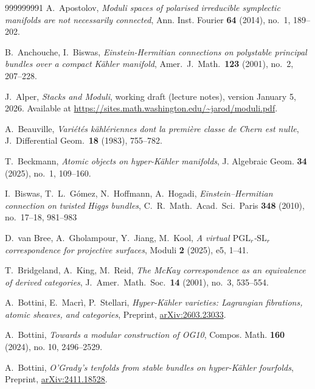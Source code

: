 \documentclass[12pt,a4paper]{amsart}
\theoremstyle{plain}
\theoremstyle{definition}
\theoremstyle{remark}
\begin{document}
\begin{thebibliography}{999999991}
\setlength{\itemsep}{6pt}
A.~Apostolov,
\textit{Moduli spaces of polarised irreducible symplectic manifolds are not necessarily connected},
Ann. Inst. Fourier \textbf{64} (2014), no.~1, 189--202.

B.~Anchouche, I.~Biswas,
\textit{Einstein-Hermitian connections on polystable principal bundles over a compact K\"ahler manifold},
Amer.\ J.\ Math.\ \textbf{123} (2001), no.~2, 207--228.

J.~Alper,
\textit{Stacks and Moduli},
working draft (lecture notes), version January 5, 2026.
Available at \url{https://sites.math.washington.edu/~jarod/moduli.pdf}.

A.~Beauville,
\textit{Vari\'et\'es k\"ahl\'eriennes dont la premi\`ere classe de Chern est nulle},
J.\ Differential Geom.\ \textbf{18} (1983), 755--782.

T.~Beckmann, \textit{Atomic objects on hyper-K\"ahler manifolds}, J. Algebraic Geom. {\bf 34} (2025), no.~1, 109--160.

I.~Biswas, T.~L.~G\'omez, N.~Hoffmann, A.~Hogadi,
\textit{Einstein--Hermitian connection on twisted Higgs bundles},
C.\ R.\ Math.\ Acad.\ Sci.\ Paris \textbf{348} (2010), no.~17--18, 981--983

D.~van Bree, A.~Gholampour, Y.~Jiang, M.~Kool,
\textit{A virtual $\mathrm{PGL}_r$-$\mathrm{SL}_r$ correspondence for projective surfaces},
Moduli \textbf{2} (2025), e5, 1--41.

T.~Bridgeland, A.~King, M.~Reid,
\textit{The McKay correspondence as an equivalence of derived categories},
J.\ Amer.\ Math.\ Soc.\ \textbf{14} (2001), no.~3, 535--554.

A.~Bottini, E.~Macr\`i, P.~Stellari,
\textit{Hyper-K\"ahler varieties: Lagrangian fibrations, atomic sheaves, and categories},
Preprint, \href{https://arxiv.org/abs/2603.23033}{arXiv:2603.23033}.

A.~Bottini, 
\textit{Towards a modular construction of OG10}, 
Compos. Math. \textbf{160} (2024), no. 10, 2496--2529.

A.~Bottini, 
\textit{O'Grady's tenfolds from stable bundles on hyper-Kähler fourfolds}, 
Preprint, \href{https://arxiv.org/abs/2411.18528}{arXiv:2411.18528}.


\end{thebibliography}
\end{document}
